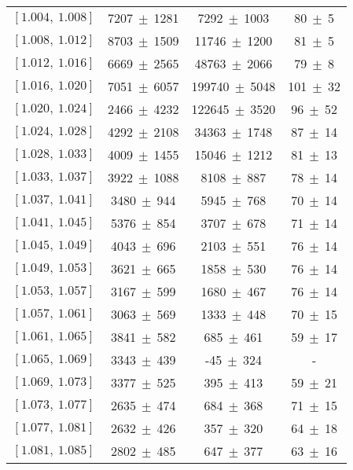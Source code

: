{\begin{table}[htbp]
\begin{center}
\begin{tabular}{cccc}
                $[1.004,\ 1.008]$   &	7207$\ \pm\ $1281&	7292$\ \pm\ $1003&	80$\ \pm\ $5 \\ 	
                $[1.008,\ 1.012]$   &	8703$\ \pm\ $1509&	11746$\ \pm\ $1200&	81$\ \pm\ $5 \\ 	
                $[1.012,\ 1.016]$   &	6669$\ \pm\ $2565&	48763$\ \pm\ $2066&	79$\ \pm\ $8 \\ 	
                $[1.016,\ 1.020]$   &	7051$\ \pm\ $6057&	199740$\ \pm\ $5048&	101$\ \pm\ $32 \\ 	
                $[1.020,\ 1.024]$   &	2466$\ \pm\ $4232&	122645$\ \pm\ $3520&	96$\ \pm\ $52 \\ 	
                $[1.024,\ 1.028]$   &	4292$\ \pm\ $2108&	34363$\ \pm\ $1748&	87$\ \pm\ $14 \\ 	
                $[1.028,\ 1.033]$   &	4009$\ \pm\ $1455&	15046$\ \pm\ $1212&	81$\ \pm\ $13 \\ 	
                $[1.033,\ 1.037]$   &	3922$\ \pm\ $1088&	8108$\ \pm\ $887&	78$\ \pm\ $14 \\ 	
                $[1.037,\ 1.041]$   &	3480$\ \pm\ $944&	5945$\ \pm\ $768&	70$\ \pm\ $14 \\ 	
                $[1.041,\ 1.045]$   &	5376$\ \pm\ $854&	3707$\ \pm\ $678&	71$\ \pm\ $14 \\ 	
                $[1.045,\ 1.049]$   &	4043$\ \pm\ $696&	2103$\ \pm\ $551&	76$\ \pm\ $14 \\ 	
                $[1.049,\ 1.053]$   &	3621$\ \pm\ $665&	1858$\ \pm\ $530&	76$\ \pm\ $14 \\ 	
                $[1.053,\ 1.057]$   &	3167$\ \pm\ $599&	1680$\ \pm\ $467&	76$\ \pm\ $14 \\ 	
                $[1.057,\ 1.061]$   &	3063$\ \pm\ $569&	1333$\ \pm\ $448&	70$\ \pm\ $15 \\ 	
                $[1.061,\ 1.065]$   &	3841$\ \pm\ $582&	685$\ \pm\ $461&	59$\ \pm\ $17 \\ 	
                $[1.065,\ 1.069]$   &	3343$\ \pm\ $439&	-45$\ \pm\ $324&	 - \\ 	
                $[1.069,\ 1.073]$   &	3377$\ \pm\ $525&	395$\ \pm\ $413&	59$\ \pm\ $21 \\ 	
                $[1.073,\ 1.077]$   &	2635$\ \pm\ $474&	684$\ \pm\ $368&	71$\ \pm\ $15 \\ 	
                $[1.077,\ 1.081]$   &	2632$\ \pm\ $426&	357$\ \pm\ $320&	64$\ \pm\ $18 \\ 	
                $[1.081,\ 1.085]$   &	2802$\ \pm\ $485&	647$\ \pm\ $377&	63$\ \pm\ $16 \\ 	

\end{tabular}
\end{center}
\end{table}}
